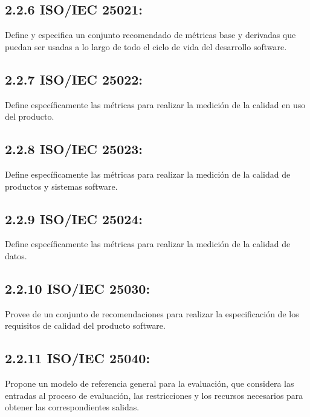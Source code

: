 \documentclass[https://www.overleaf.com/project/63761df255a8a9f4a15c3579
	letterpaper, %
	10pt, %
]{CSUniSchoolLabReport}
\begin{document}
        \subsection*{2.2.6 \hspace{0.5em} ISO/IEC 25021:}
            Define y especifica un conjunto recomendado de métricas base y derivadas que puedan ser usadas a lo largo de todo el ciclo de vida del desarrollo software.
            
        \subsection*{2.2.7 \hspace{0.5em} ISO/IEC 25022:}
            Define específicamente las métricas para realizar la medición de la calidad en uso del producto.
            
        \subsection*{2.2.8 \hspace{0.5em} ISO/IEC 25023:}
            Define específicamente las métricas para realizar la medición de la calidad de productos y sistemas software.
            
        \subsection*{2.2.9 \hspace{0.5em} ISO/IEC 25024:}
            Define específicamente las métricas para realizar la medición de la calidad de datos.
            
        \subsection*{2.2.10 \hspace{0.5em} ISO/IEC 25030:} 
            Provee de un conjunto de recomendaciones para realizar la especificación de los requisitos de calidad del producto software.
            
        \subsection*{2.2.11 \hspace{0.5em} ISO/IEC 25040:} 
            Propone un modelo de referencia general para la evaluación, que considera las entradas al proceso de evaluación, las restricciones y los recursos necesarios para obtener las correspondientes salidas.
            
\end{document}
